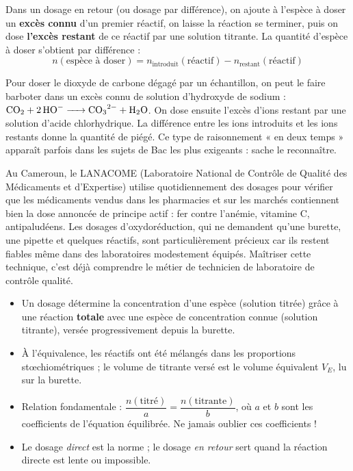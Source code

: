 \documentclass[11pt]{article}
\newcommand{\cle}[1]{{\popxbold\color{popdark}#1}}
\begin{document}
\begin{definition}
Dans un \cle{dosage en retour} (ou dosage par différence), on ajoute à l'espèce à doser un \textbf{excès connu} d'un premier réactif, on laisse la réaction se terminer, puis on dose \textbf{l'excès restant} de ce réactif par une solution titrante. La quantité d'espèce à doser s'obtient par différence :
\[ n(\text{espèce à doser}) = n_{\text{introduit}}(\text{réactif}) - n_{\text{restant}}(\text{réactif}) \]
\end{definition}

\begin{exemplebox}
Pour doser le dioxyde de carbone  dégagé par un échantillon, on peut le faire barboter dans un excès connu de solution d'hydroxyde de sodium  : $\ce{CO2 + 2 HO- -> CO3^2- + H2O}$. On dose ensuite l'excès d'ions  restant par une solution d'acide chlorhydrique. La différence entre les ions  introduits et les ions  restants donne la quantité de  piégé. Ce type de raisonnement « en deux temps » apparaît parfois dans les sujets de Bac les plus exigeants : sache le reconnaître.
\end{exemplebox}

\begin{savaistu}
Au Cameroun, le LANACOME (Laboratoire National de Contrôle de Qualité des Médicaments et d'Expertise) utilise quotidiennement des dosages pour vérifier que les médicaments vendus dans les pharmacies et sur les marchés contiennent bien la dose annoncée de principe actif : fer contre l'anémie, vitamine C, antipaludéens. Les dosages d'oxydoréduction, qui ne demandent qu'une burette, une pipette et quelques réactifs, sont particulièrement précieux car ils restent fiables même dans des laboratoires modestement équipés. Maîtriser cette technique, c'est déjà comprendre le métier de technicien de laboratoire de contrôle qualité.
\end{savaistu}

\begin{aretenir}
\begin{itemize}
\item Un \cle{dosage} détermine la concentration d'une espèce (solution \cle{titrée}) grâce à une réaction \textbf{totale} avec une espèce de concentration connue (solution \cle{titrante}), versée progressivement depuis la burette.
\item À l'\cle{équivalence}, les réactifs ont été mélangés dans les proportions stœchiométriques ; le volume de titrante versé est le \cle{volume équivalent} $V_E$, lu sur la burette.
\item Relation fondamentale : $\dfrac{n(\text{titré})}{a} = \dfrac{n(\text{titrante})}{b}$, où $a$ et $b$ sont les coefficients de l'équation équilibrée. Ne jamais oublier ces coefficients !
\item Le dosage \emph{direct} est la norme ; le dosage \emph{en retour} sert quand la réaction directe est lente ou impossible.
\end{itemize}
\end{aretenir}
\end{document}
